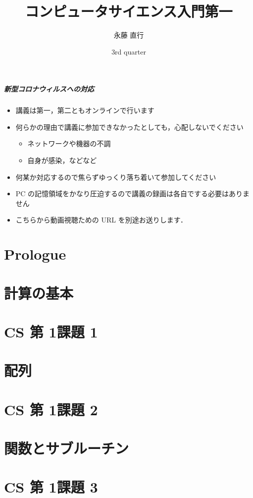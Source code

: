 \documentclass[final,c]{beamer}
\title[elementaryCS-1st]{コンピュータサイエンス入門第一}
\date[3rd quarter]{3rd quarter}
\author[Naoyuki Nagatou]{永藤 直行}
\institute[TITECH]{東京工業大学 情報理工学院}
\begin{document}
\begin{frame}
\frametitle{新型コロナウィルスへの対応}
  \begin{itemize}
\item 講義は第一，第二ともオンラインで行います
\item 何らかの理由で講義に参加できなかったとしても，心配しないでください
    \begin{itemize}
\item ネットワークや機器の不調
\item 自身が感染，などなど
    \end{itemize}
\item 何某か対応するので焦らずゆっくり落ち着いて参加してください
\item PC の記憶領域をかなり圧迫するので講義の録画は各自でする必要はありません
\item こちらから動画視聴ための URL を別途お送りします．
  \end{itemize}
\end{frame}
\frame{\titlepage}
%
%
\part{Prologue}


%
%
\part{計算の基本}

%

\part{CS 第 1\textemdash 課題 1}

%
%
\part{配列}

%
%
\part{CS 第 1\textemdash 課題 2}


\part{関数とサブルーチン}

%
%
\part{CS 第 1\textemdash 課題 3}

\end{document}
